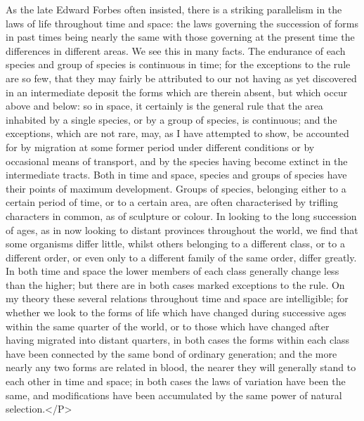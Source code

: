 \indent As the late Edward Forbes often insisted, there is a striking parallelism in the laws of life throughout time and space: the laws governing the succession of forms in past times being nearly the same with those governing at the present time the differences in different areas. We see this in many facts. The endurance of each species and group of species is continuous in time; for the exceptions to the rule are so few, that they may fairly be attributed to our not having as yet discovered in an intermediate deposit the forms which are therein absent, but which occur above and below: so in space, it certainly is the general rule that the area inhabited by a single species, or by a group of species, is continuous; and the exceptions, which are not rare, may, as I have attempted to show, be accounted for by migration at some former period under different conditions or by occasional means of transport, and by the species having become extinct in the intermediate tracts. Both in time and space, species and groups of species have their points of maximum development. Groups of species, belonging either to a certain period of time, or to a certain area, are often characterised by trifling characters in common, as of sculpture or colour. In looking to the long succession of ages, as in now looking to distant provinces throughout the world, we find that some organisms differ little, whilst others belonging to a different class, or to a different order, or even only to a different family of the same order, differ greatly. In both time and space the lower members of each class generally change less than the higher; but there are in both cases marked exceptions to the rule. On my theory these several relations throughout time and space are intelligible; for whether we look to the forms of life which have changed during successive ages within the same quarter of the world, or to those which have changed after having migrated into distant quarters, in both cases the forms within each class have been connected by the same bond of ordinary generation; and the more nearly any two forms are related in blood, the nearer they will generally stand to each other in time and space; in both cases the laws of variation have been the same, and modifications have been accumulated by the same power of natural selection.</P>